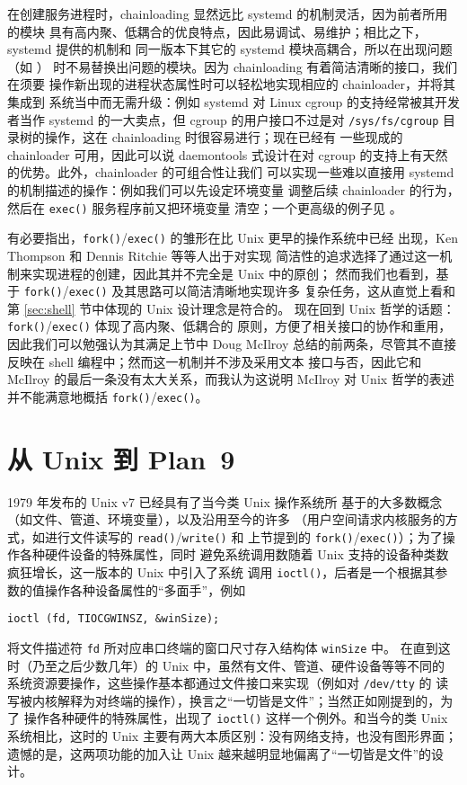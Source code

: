 在创建服务进程时，chainloading 显然远比 systemd 的机制灵活，因为前者所用的模块
具有高内聚、低耦合的优良特点，因此易调试、易维护；相比之下，systemd 提供的机制和
同一版本下其它的 systemd 模块高耦合，所以在出现问题（如 \parencite{edge2017}）
时不易替换出问题的模块。因为 chainloading 有着简洁清晰的接口，我们在须要
操作新出现的进程状态属性时可以轻松地实现相应的 chainloader，并将其集成到
系统当中而无需升级：例如 systemd 对 Linux cgroup 的支持经常被其开发者当作
systemd 的一大卖点，但 cgroup 的用户接口不过是对
\verb|/sys/fs/cgroup| 目录树的操作，这在 chainloading 时很容易进行；现在已经有
一些现成的 chainloader 可用，因此可以说 daemontools
式设计在对 cgroup 的支持上有天然的优势。此外，chainloader 的可组合性让我们
可以实现一些难以直接用 systemd 的机制描述的操作：例如我们可以先设定环境变量
调整后续 chainloader 的行为，然后在 \verb|exec()| 服务程序前又把环境变量
清空；一个更高级的例子见 \parencite{ska:syslogd}。

有必要指出，\verb|fork()|/\verb|exec()| 的雏形在比 Unix 更早的操作系统中已经
出现，Ken Thompson 和 Dennis Ritchie 等等人出于对实现
简洁性的追求选择了通过这一机制来实现进程的创建，因此其并不完全是 Unix 中的原创；
然而我们也看到，基于 \verb|fork()|/\verb|exec()| 及其思路可以简洁清晰地实现许多
复杂任务，这从直觉上看和第 \ref{sec:shell} 节中体现的 Unix 设计理念是符合的。
现在回到 Unix 哲学的话题：\verb|fork()|/\verb|exec()| 体现了高内聚、低耦合的
原则，方便了相关接口的协作和重用，因此我们可以勉强认为其满足上节中 Doug McIlroy
总结的前两条，尽管其不直接反映在 shell 编程中；然而这一机制并不涉及采用文本
接口与否，因此它和 McIlroy 的最后一条没有太大关系，而我认为这说明 McIlroy
对 Unix 哲学的表述并不能满意地概括 \verb|fork()|/\verb|exec()|。

\section{从 Unix 到 Plan~9}\label{sec:plan9}

1979 年发布的 Unix v7 已经具有了当今类 Unix 操作系统所
基于的大多数概念（如文件、管道、环境变量），以及沿用至今的许多%
（用户空间请求内核服务的方式，如进行文件读写的 \verb|read()|/\verb|write()| 和
上节提到的 \verb|fork()|/\verb|exec()|）；为了操作各种硬件设备的特殊属性，同时
避免系统调用数随着 Unix 支持的设备种类数疯狂增长，这一版本的 Unix 中引入了系统
调用 \verb|ioctl()|，后者是一个根据其参数的值操作各种设备属性的“多面手”，例如
\begin{quoting}
\begin{Verbatim}
ioctl (fd, TIOCGWINSZ, &winSize);
\end{Verbatim}
\end{quoting}
将文件描述符 \verb|fd| 所对应串口终端的窗口尺寸存入结构体 \verb|winSize| 中。
在直到这时（乃至之后少数几年）的 Unix 中，虽然有文件、管道、硬件设备等等不同的
系统资源要操作，这些操作基本都通过文件接口来实现（例如对 \verb|/dev/tty| 的
读写被内核解释为对终端的操作），换言之“一切皆是文件”；当然正如刚提到的，为了
操作各种硬件的特殊属性，出现了 \verb|ioctl()| 这样一个例外。和当今的类 Unix
系统相比，这时的 Unix 主要有两大本质区别：没有网络支持，也没有图形界面；
遗憾的是，这两项功能的加入让 Unix 越来越明显地偏离了“一切皆是文件”的设计。

